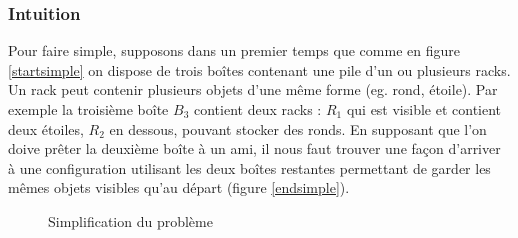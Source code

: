 \documentclass[a4paper]{article}
\begin{document}
\subsubsection{Intuition}
Pour faire simple, supposons dans un premier temps que comme en figure
\ref{startsimple} on dispose de trois boîtes contenant une pile d'un ou
plusieurs racks. Un rack peut contenir plusieurs objets d'une même forme (eg. rond, étoile).
Par exemple la troisième boîte $B_3$ contient deux racks : $R_1$ qui est
visible et contient deux étoiles, $R_2$ en dessous, pouvant stocker des
ronds. En supposant que l'on doive prêter la deuxième boîte à un ami, il
nous faut trouver une façon d'arriver à une configuration utilisant les
deux boîtes restantes permettant de garder les mêmes objets visibles qu'au
départ (figure \ref{endsimple}).
\begin{figure}[!ht]
	\centering
	\caption{\label{simple} Simplification du problème}
\end{figure}
\end{document}
